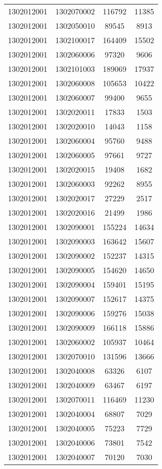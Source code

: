 \begin{longtable}{llcc}
1302012001 & 1302070002 & 116792 & 11385\\
1302012001 & 1302050010 & 89545 & 8913\\
1302012001 & 1302100017 & 164409 & 15502\\
1302012001 & 1302060006 & 97320 & 9606\\
1302012001 & 1302101003 & 189069 & 17937\\
1302012001 & 1302060008 & 105653 & 10422\\
1302012001 & 1302060007 & 99400 & 9655\\
1302012001 & 1302020011 & 17833 & 1503\\
1302012001 & 1302020010 & 14043 & 1158\\
1302012001 & 1302060004 & 95760 & 9488\\
1302012001 & 1302060005 & 97661 & 9727\\
1302012001 & 1302020015 & 19408 & 1682\\
1302012001 & 1302060003 & 92262 & 8955\\
1302012001 & 1302020017 & 27229 & 2517\\
1302012001 & 1302020016 & 21499 & 1986\\
1302012001 & 1302090001 & 155224 & 14634\\
1302012001 & 1302090003 & 163642 & 15607\\
1302012001 & 1302090002 & 152237 & 14315\\
1302012001 & 1302090005 & 154620 & 14650\\
1302012001 & 1302090004 & 159401 & 15195\\
1302012001 & 1302090007 & 152617 & 14375\\
1302012001 & 1302090006 & 159276 & 15038\\
1302012001 & 1302090009 & 166118 & 15886\\
1302012001 & 1302060002 & 105937 & 10464\\
1302012001 & 1302070010 & 131596 & 13666\\
1302012001 & 1302040008 & 63326 & 6107\\
1302012001 & 1302040009 & 63467 & 6197\\
1302012001 & 1302070011 & 116469 & 11230\\
1302012001 & 1302040004 & 68807 & 7029\\
1302012001 & 1302040005 & 75223 & 7729\\
1302012001 & 1302040006 & 73801 & 7542\\
1302012001 & 1302040007 & 70120 & 7030\\

\end{longtable}
